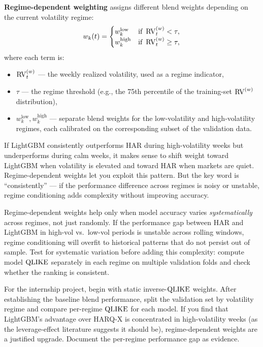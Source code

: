 \textbf{Regime-dependent weighting} assigns different blend weights
depending on the current volatility regime:
\begin{equation}\label{eq:regime-weights}
  w_k(t) =
  \begin{cases}
    w_k^{\text{low}} & \text{if } \operatorname{RV}_t^{(w)} < \tau, \\
    w_k^{\text{high}} & \text{if } \operatorname{RV}_t^{(w)} \geq \tau,
  \end{cases}
\end{equation}
where each term is:
\begin{itemize}
  \item $\operatorname{RV}_t^{(w)}$ --- the weekly realized volatility, used as a
        regime indicator,
  \item $\tau$ --- the regime threshold (e.g., the 75th percentile
        of the training-set $\operatorname{RV}^{(w)}$ distribution),
  \item $w_k^{\text{low}}, w_k^{\text{high}}$ --- separate blend
        weights for the low-volatility and high-volatility regimes,
        each calibrated on the corresponding subset of the validation
        data.
\end{itemize}

\begin{intuition}
If LightGBM consistently outperforms HAR during high-volatility weeks
but underperforms during calm weeks, it makes sense to shift weight
toward LightGBM when volatility is elevated and toward HAR when
markets are quiet.  Regime-dependent weights let you exploit this
pattern.  But the key word is ``consistently'' --- if the performance
difference across regimes is noisy or unstable, regime conditioning
adds complexity without improving accuracy.
\end{intuition}

\begin{warning}
Regime-dependent weights help only when model accuracy varies
\emph{systematically} across regimes, not just randomly.  If the
performance gap between HAR and LightGBM in high-vol vs.\ low-vol
periods is unstable across rolling windows, regime conditioning will
overfit to historical patterns that do not persist out of sample.
Test for systematic variation before adding this complexity: compute
model $\operatorname{QLIKE}$ separately in each regime on multiple validation folds
and check whether the ranking is consistent.
\end{warning}

\begin{projectconnection}
For the internship project, begin with static inverse-$\operatorname{QLIKE}$
weights.  After establishing the baseline blend performance, split the
validation set by volatility regime and compare per-regime $\operatorname{QLIKE}$ for
each model.  If you find that LightGBM's advantage over HARQ-X is
concentrated in high-volatility weeks (as the leverage-effect
literature suggests it should be), regime-dependent weights are a
justified upgrade.  Document the per-regime performance gap as evidence.
\end{projectconnection}


